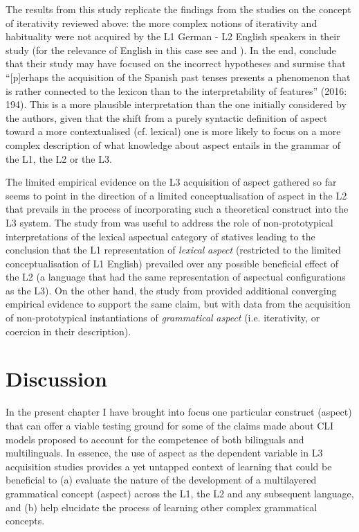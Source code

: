 \documentclass[output=paper,modfonts,nonflat,newtxmath]{langsci/langscibook}
\begin{document}
The results from this study replicate the findings from the studies on the concept of iterativity reviewed above: the more complex notions of iterativity and habituality were not acquired by the L1 German - L2 English speakers in their study (for the relevance of English in this case see \citealt{AthanasopoulosBylund2013} and \citealt{AthanasopoulosEtAl2015}). In the end, \citeauthor{DiaubalickGuijarro-Fuentes2016} conclude that their study may have focused on the incorrect hypotheses and surmise that “[p]erhaps the acquisition of the Spanish past tenses presents a phenomenon that is rather connected to the lexicon than to the interpretability of features” (2016: 194). This is a more plausible interpretation than the one initially considered by the authors, given that the shift from a purely syntactic definition of aspect toward a more contextualised (cf. lexical) one is more likely to focus on a more complex description of what knowledge about aspect entails in the grammar of the L1, the L2 or the L3.

The limited empirical evidence on the L3 acquisition of aspect gathered so far seems to point in the direction of a limited conceptualisation of aspect in the L2 that prevails in the process of incorporating such a theoretical construct into the L3 system. The study from \citet{Salaberry2005} was useful to address the role of non-prototypical interpretations of the lexical aspectual category of statives leading to the conclusion that the L1 representation of \textit{lexical} \textit{aspect} (restricted to the limited conceptualisation of L1 English) prevailed over any possible beneficial effect of the L2 (a language that had the same representation of aspectual configurations as the L3). On the other hand, the study from \citet{DiaubalickGuijarro-Fuentes2016} provided additional converging empirical evidence to support the same claim, but with data from the acquisition of non-prototypical instantiations of \textit{grammatical} \textit{aspect} (i.e. iterativity, or coercion in their description).

\section{{Discussion}}%
\label{sec:salaberry:4}

In the present chapter I have brought into focus one particular construct (aspect) that can offer a viable testing ground for some of the claims made about CLI models proposed to account for the competence of both bilinguals and multilinguals. In essence, the use of aspect as the dependent variable in L3 acquisition studies provides a yet untapped context of learning that could be beneficial to (a) evaluate the nature of the development of a multilayered grammatical concept (aspect) across the L1, the L2 and any subsequent language, and (b) help elucidate the process of learning other complex grammatical concepts.
\end{document}
